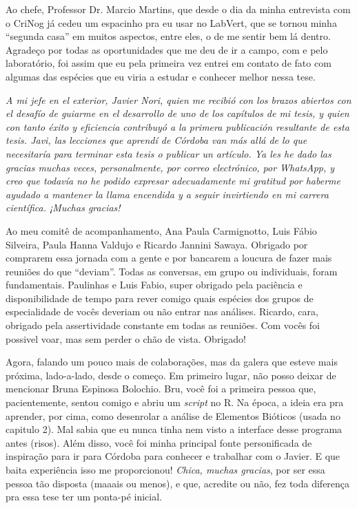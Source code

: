 \documentclass[12pt,openright,oneside,a4paper,english]{abntex2}
\begin{document}
\begin{agradecimentos}[Agradecimentos]
Ao chefe, Professor Dr. Marcio Martins, que desde o dia da minha entrevista com o CriNog já cedeu um espacinho pra eu usar no LabVert, que se tornou minha “segunda casa” em muitos aspectos, entre eles, o de me sentir bem lá dentro. Agradeço por todas as oportunidades que me deu de ir a campo, com e pelo laboratório, foi assim que eu pela primeira vez entrei em contato de fato com algumas das espécies que eu viria a estudar e conhecer melhor nessa tese.

\textit{A mi jefe en el exterior, Javier Nori, quien me recibió con los brazos abiertos con el desafío de guiarme en el desarrollo de uno de los capítulos de mi tesis, y quien con tanto éxito y eficiencia contribuyó a la primera publicación resultante de esta tesis. Javi, las lecciones que aprendí de Córdoba van más allá de lo que necesitaría para terminar esta tesis o publicar un artículo. Ya les he dado las gracias muchas veces, personalmente, por correo electrónico, por WhatsApp, y creo que todavía no he podido expresar adecuadamente mi gratitud por haberme ayudado a mantener la llama encendida y a seguir invirtiendo en mi carrera científica. ¡Muchas gracias!}

Ao meu comitê de acompanhamento, Ana Paula Carmignotto, Luis Fábio Silveira, Paula Hanna Valdujo e Ricardo Jannini Sawaya. Obrigado por comprarem essa jornada com a gente e por bancarem a loucura de fazer mais reuniões do que “deviam”. Todas as conversas, em grupo ou individuais, foram fundamentais. Paulinhas e Luis Fabio, super obrigado pela paciência e disponibilidade de tempo para rever comigo quais espécies dos grupos de especialidade de vocês deveriam ou não entrar nas análises. Ricardo, cara, obrigado pela assertividade constante em todas as reuniões. Com vocês foi possivel voar, mas sem perder o chão de vista. Obrigado!

Agora, falando um pouco mais de colaborações, mas da galera que esteve mais próxima, lado-a-lado, desde o começo. Em primeiro lugar, não posso deixar de mencionar Bruna Espinosa Bolochio. Bru, você foi a primeira pessoa que, pacientemente, sentou comigo e abriu um \textit{script} no R. Na época, a ideia era pra aprender, por cima, como desenrolar a análise de Elementos Bióticos (usada no capitulo 2). Mal sabia que eu nunca tinha nem visto a interface desse programa antes (risos). Além disso, você foi minha principal fonte personificada de inspiração para ir para Córdoba para conhecer e trabalhar com o Javier. E que baita experiência isso me proporcionou! \textit{Chica, muchas gracias}, por ser essa pessoa tão disposta (maaais ou menos), e que, acredite ou não, fez toda diferença pra essa tese ter um ponta-pé inicial.


\end{agradecimentos}
\end{document}
